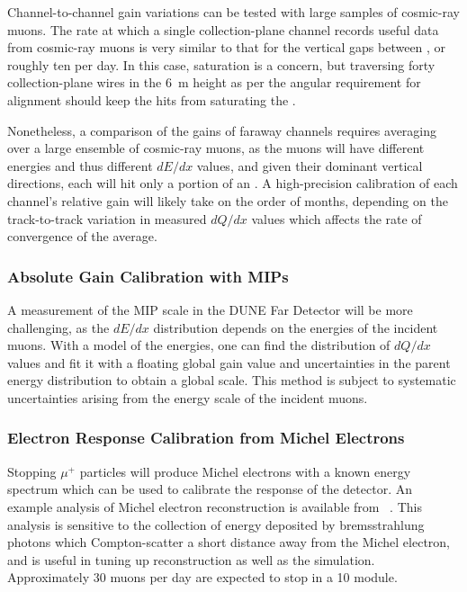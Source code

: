 Channel-to-channel gain variations can be tested with large samples of cosmic-ray muons.  The rate at
which a single collection-plane channel records useful data from cosmic-ray muons is very similar to that
for the vertical gaps between , or roughly ten per day.  In this case,  saturation is a concern,
but traversing forty collection-plane wires in the \SI{6}{\m} height as per the angular requirement for alignment
should keep the hits from saturating the .

Nonetheless, a comparison of the gains of faraway channels requires averaging over a large ensemble
of cosmic-ray muons, as the muons will have different energies and thus different $dE/dx$ values,
and given their dominant vertical directions, each will hit only a portion of an .  A high-precision
calibration of each channel's relative gain will likely take on the order of months, depending
on the track-to-track variation in measured $dQ/dx$ values which affects the rate of convergence
of the average.

\subsubsection{Absolute Gain Calibration with MIPs}

A measurement of the MIP scale in the DUNE Far Detector will be more challenging, as the $dE/dx$
distribution depends on the energies of the incident muons.  With a model of the energies,
one can find the distribution of $dQ/dx$ values and fit it with a floating global gain value
and uncertainties in the parent energy distribution to obtain a global scale.  This method
is subject to systematic uncertainties arising from the energy scale of the incident muons.

\subsubsection{Electron Response Calibration from Michel Electrons}

Stopping $\mu^+$ particles will produce Michel electrons with a known energy spectrum which can
be used to calibrate the response of the detector.  An example analysis of Michel electron
reconstruction is available from ~\cite{Acciarri:2017sjy}.  This analysis is sensitive
to the collection of energy deposited by bremsstrahlung photons which Compton-scatter a short distance away from
the Michel electron, and is useful in tuning up reconstruction as well as the simulation.  Approximately
\num{30} muons per day are expected to stop in a \SI{10}{\kt} module.


